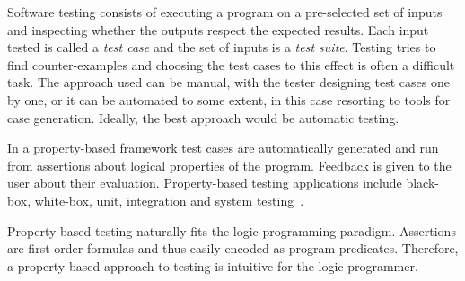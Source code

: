 \documentclass[runningheads,a4paper]{../../PaperStyles/llncs}
\newcommand{\todo}[2][?]{\marginpar{\raggedright \tiny TODO: #2}}
\newcommand{\Prolog}[0]{{\sf Prolog}}
\begin{document}
Software testing consists of executing a program on
a pre-selected set of inputs and inspecting whether the outputs
respect the expected results.
%
Each input tested is called a \emph{test case} and the set of inputs is
a \emph{test suite}.
%
Testing tries to find counter-examples
%
and choosing 
the test cases %
to this effect
is often a difficult
task.
%
The approach used can be  manual, with the tester designing test cases
one by one, or it can be automated to some extent, in this case
resorting to tools for case generation.
%
Ideally, the best approach would be automatic testing.
%


In a property-based framework test cases are automatically generated and run
from assertions about logical properties of the program.
%
Feedback is given to the user about their
evaluation.
%
Property-based testing applications include
black-box, white-box, unit, integration and system testing~\cite{Claessen-ranking-prog-blackbox,Claessen-find-race-cond-erl,Boberg-model-based-testing-erl}.




Property-based testing naturally fits the logic programming paradigm. 
%
%
%
Assertions are first order formulas and thus easily encoded as program predicates.
%
Therefore, a property based approach to testing is intuitive for the
logic programmer.
\end{document}
